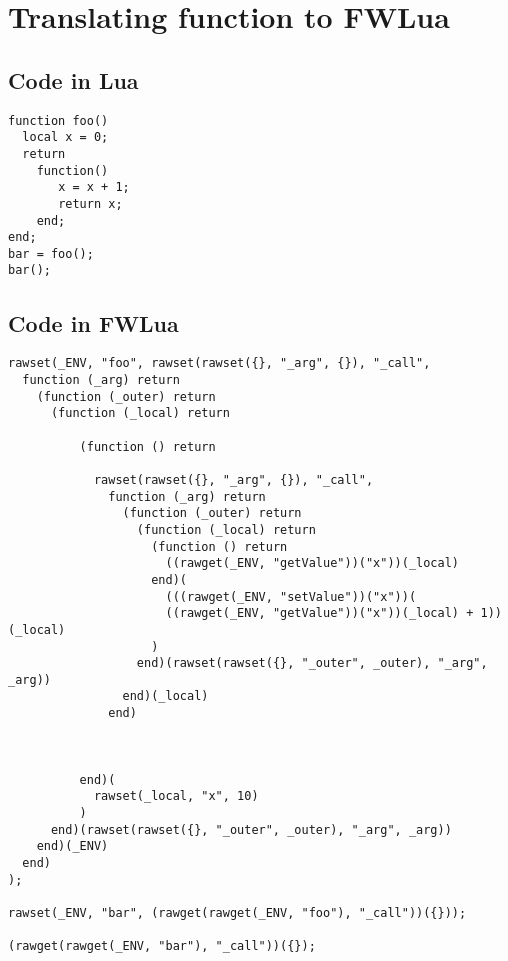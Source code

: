 \chapter{Translating function to FWLua\label{app:function}}

\section{Code in Lua}

\begin{verbatim}
function foo()
  local x = 0;
  return 
    function() 
       x = x + 1;
       return x; 
    end;
end;
bar = foo();
bar();
\end{verbatim}

\newpage
\section{Code in FWLua}

\begin{verbatim}
rawset(_ENV, "foo", rawset(rawset({}, "_arg", {}), "_call",
  function (_arg) return
    (function (_outer) return
      (function (_local) return

          (function () return

            rawset(rawset({}, "_arg", {}), "_call",
              function (_arg) return
                (function (_outer) return
                  (function (_local) return
                    (function () return
                      ((rawget(_ENV, "getValue"))("x"))(_local)
                    end)(
                      (((rawget(_ENV, "setValue"))("x"))(
                      ((rawget(_ENV, "getValue"))("x"))(_local) + 1))(_local)
                    )
                  end)(rawset(rawset({}, "_outer", _outer), "_arg", _arg))
                end)(_local)
              end)



          end)(
            rawset(_local, "x", 10)
          )
      end)(rawset(rawset({}, "_outer", _outer), "_arg", _arg))
    end)(_ENV)
  end)
);

rawset(_ENV, "bar", (rawget(rawget(_ENV, "foo"), "_call"))({}));

(rawget(rawget(_ENV, "bar"), "_call"))({});

\end{verbatim}

